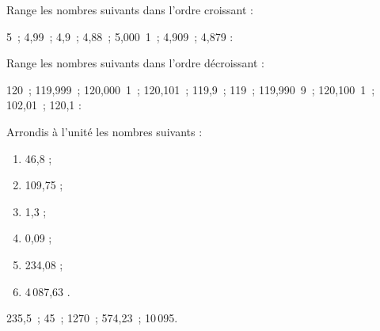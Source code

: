 \begin{exercice}[Rangement]
Range les nombres suivants dans l'ordre croissant :

5 ; 4,99 ; 4,9 ; 4,88 ; 5,000 1 ; 4,909 ; 4,879 :

\dotfill

\dotfill
\end{exercice}


\begin{exercice}
Range les nombres suivants dans l'ordre décroissant :

120 ; 119,999 ; 120,000 1 ; 120,101 ; 119,9 ; 119 ; 119,990 9 ; 120,100 1 ; 102,01 ; 120,1 :

\dotfill

\dotfill
\end{exercice}



\begin{exercice}
Arrondis à l'unité les nombres suivants :
\begin{enumerate}
 \item 46,8 \dotfill ; \hspace*{13em}
 
 \item 109,75 \dotfill ; \hspace*{13em}
 
 \item 1,3 \dotfill ; \hspace*{13em}
 
 \item 0,09 \dotfill ; \hspace*{13em}
 
 \item 234,08 \dotfill ; \hspace*{13em}
 
 \item 4\,087,63 \dotfill. \hspace*{13em}
 
 \end{enumerate}
\end{exercice}




\begin{exercice}
235,5 ; 45 ; 1270 ; 574,23 ; 10\,095.
\end{exercice}


